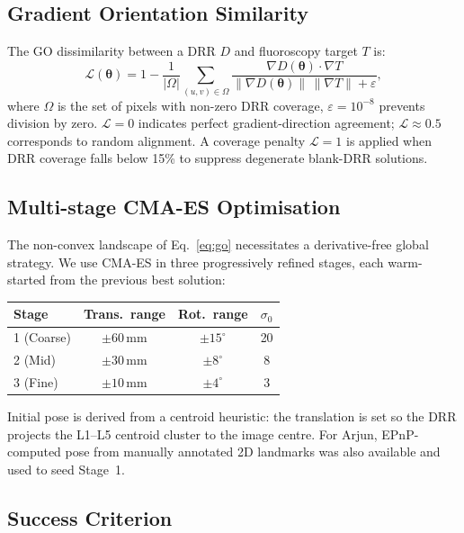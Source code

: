 \documentclass[10pt,a4paper]{article}
\begin{document}
\subsection{Gradient Orientation Similarity}
\label{sec:go}

The GO dissimilarity between a DRR $D$ and fluoroscopy target $T$
is:
\begin{equation}
  \mathcal{L}(\boldsymbol{\theta}) =
  1 - \frac{1}{|\Omega|}\sum_{(u,v)\in\Omega}
  \frac{\nabla D(\boldsymbol{\theta})\cdot\nabla T}
       {\|\nabla D(\boldsymbol{\theta})\|\,\|\nabla T\| + \varepsilon},
  \label{eq:go}
\end{equation}
where $\Omega$ is the set of pixels with non-zero DRR coverage,
$\varepsilon=10^{-8}$ prevents division by zero.
$\mathcal{L}=0$ indicates perfect gradient-direction agreement;
$\mathcal{L}\approx0.5$ corresponds to random alignment.
A coverage penalty $\mathcal{L}=1$ is applied when DRR coverage
falls below 15\% to suppress degenerate blank-DRR solutions.

\subsection{Multi-stage CMA-ES Optimisation}
\label{sec:cmaes}

The non-convex landscape of Eq.~\eqref{eq:go} necessitates a
derivative-free global strategy.
We use CMA-ES \citep{Hansen2016} in three progressively
refined stages, each warm-started from the previous best solution:

\begin{center}
\begin{tabular}{lccc}
\toprule
Stage & Trans.\ range & Rot.\ range & $\sigma_0$ \\
\midrule
1 (Coarse) & $\pm60$\,mm & $\pm15^\circ$ & 20 \\
2 (Mid)    & $\pm30$\,mm & $\pm8^\circ$  & 8  \\
3 (Fine)   & $\pm10$\,mm & $\pm4^\circ$  & 3  \\
\bottomrule
\end{tabular}
\end{center}

Initial pose is derived from a centroid heuristic: the translation is
set so the DRR projects the L1--L5 centroid cluster to the image
centre.
For Arjun, EPnP-computed pose from manually annotated 2D landmarks
was also available and used to seed Stage~1.

\subsection{Success Criterion}
\label{sec:success}
\end{document}
